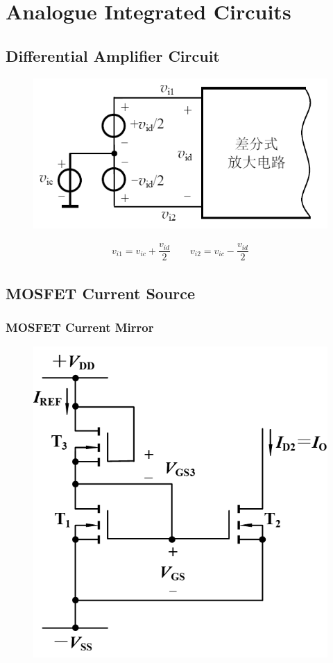 \chapter{Analogue Integrated Circuits}

\section{Differential Amplifier Circuit}

\begin{figure}[H]
  \centering
  \includegraphics[width=0.5\linewidth]{figures/Differential-Amplifier}
\end{figure}

\begin{equation*}
  \begin{aligned}
    v_{i1} = v_{ic} + \dfrac{v_{id}}{2} \quad\quad
    v_{i2} = v_{ic} - \dfrac{v_{id}}{2} 
  \end{aligned}
\end{equation*}


\section{MOSFET Current Source}

\subsection{MOSFET Current Mirror}

\begin{figure}[H]
  \centering
  \includegraphics[width=0.4\linewidth]{figures/Current-Source}
\end{figure}

